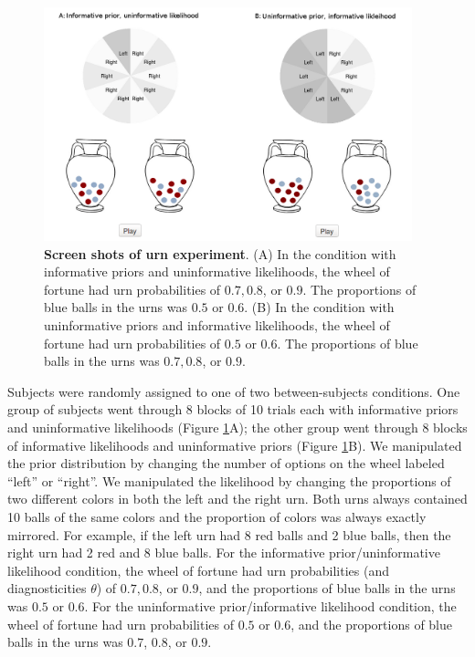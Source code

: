 \begin{figure}
\includegraphics[width=0.95\textwidth]{figures/urns.png}
\caption{\textbf{Screen shots of urn experiment}. (A) In the condition with informative priors and uninformative likelihoods, the wheel of fortune had urn probabilities of $0.7, 0.8$, or $0.9$. The proportions of blue balls in the urns was $0.5$ or $0.6$. (B) In the condition with uninformative priors and informative likelihoods, the wheel of fortune had urn probabilities of $0.5$ or $0.6$. The proportions of blue balls in the urns was $0.7, 0.8$, or $0.9$.}
\label{fig:urnscreen}
\end{figure}

Subjects were randomly assigned to one of two between-subjects conditions. One group of subjects went through 8 blocks of 10 trials each with informative priors and uninformative likelihoods (Figure \ref{fig:urnscreen}A); the other group went through 8 blocks of informative likelihoods and uninformative priors (Figure \ref{fig:urnscreen}B). We manipulated the prior distribution by changing the number of options on the wheel labeled ``left'' or ``right''. We manipulated the likelihood by changing the proportions of two different colors in both the left and the right urn. Both urns always contained 10 balls of the same colors and the proportion of colors was always exactly mirrored. For example, if the left urn had 8 red balls and 2 blue balls, then the right urn had 2 red and 8 blue balls. For the informative prior/uninformative likelihood condition, the wheel of fortune had urn probabilities (and diagnosticities $\theta$) of $0.7, 0.8$, or $0.9$, and the proportions of blue balls in the urns was $0.5$ or $0.6$. For the uninformative prior/informative likelihood condition, the wheel of fortune had urn probabilities of $0.5$ or $0.6$, and the proportions of blue balls in the urns was $0.7$, $0.8$, or $0.9$.

